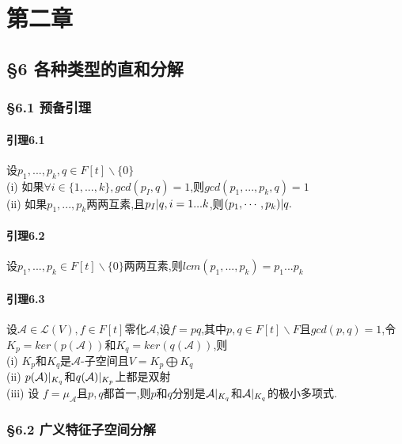 \documentclass{ctexart}
\begin{document}
\section{第二章}
\subsection{§6 各种类型的直和分解}

\subsubsection{§6.1 预备引理}

\paragraph{引理6.1}
设$p_{1},...,p_{k},q \in F[t]\backslash \{0\}$\\
(i) 如果$\forall i \in \{1,...,k\},gcd(p_{I},q) = 1$,则$gcd(p_{1},...,p_{k},q) = 1$\\
(ii) 如果$p_{1},...,p_{k}$两两互素,且$p_{I}\arrowvert q, i=1...k$,则$(p_{1},\cdots ,p_{k}) \arrowvert q.$\\

\paragraph{引理6.2}
设$p_{1},...,p_{k} \in F[t] \backslash \{0\}$两两互素,则$lcm(p_{1},...,p_{k}) = p_{1}...p_{k}$

\paragraph{引理6.3}
设$\mathcal{A} \in \mathcal{L}(V),f\in F[t]$零化$\mathcal{A}$,设$f=pq$,其中$p,q\in F[t] \backslash F$且$gcd(p,q) = 1$,令$K_{p}=ker(p(\mathcal{A}))$和$K_{q}=ker(q(\mathcal{A}))$,则\\
(i) $K_{p}$和$K_{q}$是$\mathcal{A}$-子空间且$V=K_{p}\bigoplus K_{q}$\\
(ii) $p(\mathcal{A})\arrowvert_{K_{q}}$和$q(\mathcal{A})\arrowvert_{K_{p}}$上都是双射\\
(iii) 设 $f=\mu_{\mathcal{A}}$且$p,q$都首一,则$p$和$q$分别是$\mathcal{A}\arrowvert_{K_{q}}$和$\mathcal{A}\arrowvert_{K_{q}}$的极小多项式.

\subsubsection{§6.2 广义特征子空间分解}
\end{document}
